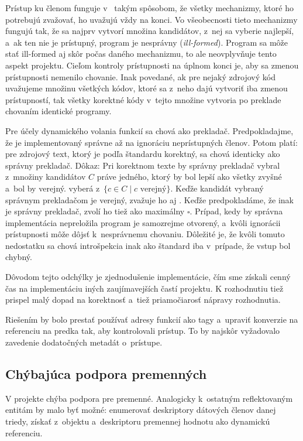 Prístup ku členom funguje v~\Cpp{} takým spôsobom, že všetky mechanizmy, ktoré ho potrebujú zvažovať, ho uvažujú vždy na konci. Vo všeobecnosti tieto mechanizmy fungujú tak, že sa najprv vytvorí množina kandidátov, z~nej sa vyberie najlepší, a~ak ten nie je prístupný, program je nesprávny (\emph{ill-formed}). Program sa môže stať ill-formed aj skôr počas daného mechanizmu, to ale neovplyvňuje tento aspekt projektu. Cieľom kontroly prístupnosti na úplnom konci je, aby sa zmenou prístupnosti nemenilo chovanie. Inak povedané, ak pre nejaký zdrojový kód uvažujeme množinu všetkých kódov, ktoré sa z~neho dajú vytvoriť iba zmenou prístupností, tak všetky korektné kódy v~tejto množine vytvoria po preklade chovaním identické programy.

Pre účely dynamického volania funkcií sa chová \PPreflection{} ako prekladač. Predpokladajme, že je implementovaný správne až na ignoráciu neprístupných členov. Potom platí: pre zdrojový text, ktorý je podľa štandardu korektný, sa chová \PPreflection{} identicky ako správny prekladač. Dôkaz: Pri korektnom texte by správny prekladač vybral z~množiny kandidátov $C$ práve jedného, ktorý by bol lepší ako všetky zvyšné a~bol by verejný. \PPreflection{} vyberá z~$\{c \in C \mid c \text{ verejný}\}$. Keďže kandidát vybraný správnym prekladačom je verejný, zvažuje ho aj \PPreflection. Keďže predpokladáme, že inak je \PPreflection{} správny prekladač, zvolí ho tiež ako maximálny $\square$. Prípad, kedy by správna implementácia nepreložila program je samozrejme otvorený, a~kvôli ignorácii prístupnosti môže dôjsť k~nesprávnemu chovaniu. Dôležité je, že kvôli tomuto nedostatku sa chová introšpekcia inak ako štandard iba v~prípade, že vstup bol chybný.

Dôvodom tejto odchýlky je zjednodušenie implementácie, čím sme získali cenný čas na implementáciu iných zaujímavejších častí projektu. K rozhodnutiu tiež prispel malý dopad na korektnosť a~tiež priamočiarosť nápravy rozhodnutia.

Riešením by bolo prestať používať adresy funkcií ako tagy a~upraviť konverzie na referenciu na predka tak, aby kontrolovali prístup. To by najskôr vyžadovalo zavedenie dodatočných metadát o~prístupe.

\subsection{Chýbajúca podpora premenných}

V projekte chýba podpora pre premenné. Analogicky k~ostatným reflektovaným entitám by malo byť možné: enumerovať deskriptory dátových členov danej triedy, získať z~objektu a~deskriptoru premennej hodnotu ako dynamickú referenciu.

